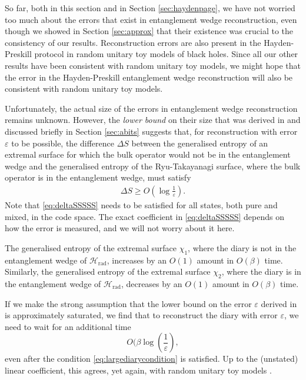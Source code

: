 \documentclass[12pt]{article}
\begin{document}
So far, both in this section and in Section \ref{sec:haydenpage}, we have not worried too much about the errors that exist in entanglement wedge reconstruction, even though we showed in Section \ref{sec:approx} that their existence was crucial to the consistency of our results. Reconstruction errors are also present in the Hayden-Preskill protocol in random unitary toy models of black holes. Since all our other results have been consistent with random unitary toy models, we might hope that the error in the Hayden-Preskill entanglement wedge reconstruction will also be consistent with random unitary toy models.

Unfortunately, the actual size of the errors in entanglement wedge reconstruction remains unknown. However, the \emph{lower bound} on their size that was derived in \cite{hayden2018learning} and discussed briefly in Section \ref{sec:abits} suggests that, for reconstruction with error $\varepsilon$ to be possible, the difference $\Delta S$ between the generalised entropy of an extremal surface for which the bulk operator would not be in the entanglement wedge and the generalised entropy of the Ryu-Takayanagi surface, where the bulk operator is in the entanglement wedge, must satisfy
\begin{align} \label{eq:deltaSSSSS}
\Delta S \geq O(\log \frac{1}{\varepsilon}).
\end{align}
Note that \eqref{eq:deltaSSSSS} needs to be satisfied for all states, both pure and mixed, in the code space. The exact coefficient in \eqref{eq:deltaSSSSS} depends on how the error is measured, and we will not worry about it here. 

The generalised entropy of the extremal surface $\chi_1$, where the diary is not in the entanglement wedge of $\mathcal{H}_\text{rad}$, increases by an $O(1)$ amount in $O(\beta)$ time. Similarly, the generalised entropy of the extremal surface $\chi_2$, where the diary is in the entanglement wedge of $\mathcal{H}_\text{rad}$, decreases by an $O(1)$ amount in $O(\beta)$ time.

If we make the strong assumption that the lower bound on the error $\varepsilon$ derived in \cite{hayden2018learning} is approximately saturated, we find that to reconstruct the diary with error $\varepsilon$, we need to wait for an additional time
$$
O(\beta \log(\frac{1}{\varepsilon}),
$$
even after the condition \eqref{eq:largediarycondition} is satisfied. Up to the (unstated) linear coefficient, this agrees, yet again, with random unitary toy models \cite{hayden2007black, alphabits}.
\end{document}
